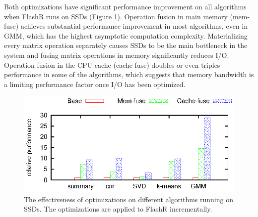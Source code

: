 Both optimizations have significant performance improvement on all
algorithms when FlashR runs on SSDs (Figure \ref{perf:em_opts}).
Operation fusion in main memory (mem-fuse) achieves
substantial performance improvement in most algorithms, even in GMM,
which has the highest asymptotic computation complexity. 
Materializing every matrix operation
separately causes SSDs to be the main bottleneck in the system and
fusing matrix operations in memory significantly reduces I/O.
Operation fusion in the CPU cache (cache-fuse) doubles or even triples
performance in some of the algorithms,
which suggests that memory bandwidth is a limiting performance factor once 
I/O has been optimized.

\begin{figure}
	\begin{center}
		\footnotesize
		\includegraphics{FlashMatrix_figs/opts-EM.eps}
		\vspace{-10pt}
		\caption{The effectiveness of optimizations on different algorithms
		running on SSDs. The optimizations are applied to FlashR
		incrementally.}
		\label{perf:em_opts}
	\end{center}
  \vspace{-15pt}
\end{figure}
